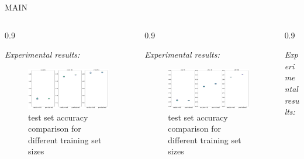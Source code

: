 \documentclass[final]{beamer}
\newlength{\onecolwid}
\newlength{\threecolwid}
\begin{document}
\begin{frame}[t]
\begin{columns}[t]
\begin{column}{\threecolwid}
\begin{alertblock}{MAIN}
\begin{columns}[t, totalwidth=0.9\threecolwid]
\begin{column}{0.9\onecolwid} %
\begin{block}{}
\emph{Experimental results:}

\begin{figure}
\includegraphics[width=\linewidth]{box_plots/boxplots_mnist.png}
\caption{test set accuracy comparison for different training set sizes}
\end{figure}

\end{block}
\end{column}
\begin{column}{0.9\onecolwid}
\begin{block}{}
\emph{Experimental results:}

\begin{figure}
\includegraphics[width=\linewidth]{box_plots/boxplots_cifar.png}
\caption{test set accuracy comparison for different training set sizes}
\end{figure}

\end{block}
\end{column}

\begin{column}{0.9\onecolwid}
\begin{block}{}
\emph{Experimental results:}
\end{block}



\end{column}
\end{columns}
\end{alertblock}
\end{column}
\end{columns}
\end{frame}
\end{document}
